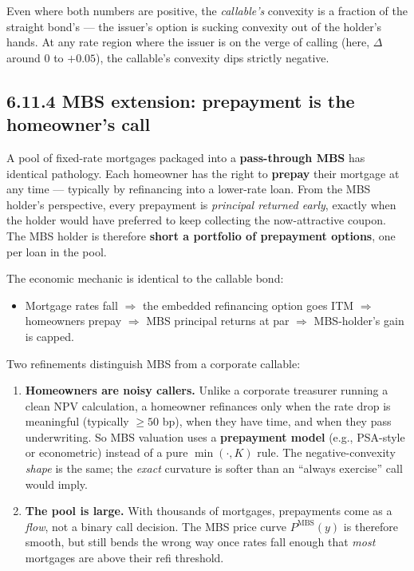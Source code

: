 \documentclass[
  10pt,
  twoside]{book}
\providecommand{\tightlist}{%
  \setlength{\itemsep}{0pt}\setlength{\parskip}{0pt}}
\begin{document}
Even where both numbers are positive, the \emph{callable's} convexity is
a fraction of the straight bond's --- the issuer's option is sucking
convexity out of the holder's hands. At any rate region where the issuer
is on the verge of calling (here, \(\Delta\) around \(0\) to \(+0.05\)),
the callable's convexity dips strictly negative.

\subsection{6.11.4 MBS extension: prepayment is the homeowner's
call}\label{mbs-extension-prepayment-is-the-homeowners-call}

A pool of fixed-rate mortgages packaged into a \textbf{pass-through MBS}
has identical pathology. Each homeowner has the right to \textbf{prepay}
their mortgage at any time --- typically by refinancing into a
lower-rate loan. From the MBS holder's perspective, every prepayment is
\emph{principal returned early}, exactly when the holder would have
preferred to keep collecting the now-attractive coupon. The MBS holder
is therefore \textbf{short a portfolio of prepayment options}, one per
loan in the pool.

The economic mechanic is identical to the callable bond:

\begin{itemize}
\tightlist
\item
  Mortgage rates fall \(\Rightarrow\) the embedded refinancing option
  goes ITM \(\Rightarrow\) homeowners prepay \(\Rightarrow\) MBS
  principal returns at par \(\Rightarrow\) MBS-holder's gain is capped.
\end{itemize}

Two refinements distinguish MBS from a corporate callable:

\begin{enumerate}
\def\labelenumi{\arabic{enumi}.}
\tightlist
\item
  \textbf{Homeowners are noisy callers.} Unlike a corporate treasurer
  running a clean NPV calculation, a homeowner refinances only when the
  rate drop is meaningful (typically \(\geq 50\) bp), when they have
  time, and when they pass underwriting. So MBS valuation uses a
  \textbf{prepayment model} (e.g., PSA-style or econometric) instead of
  a pure \(\min(\cdot, K)\) rule. The negative-convexity \emph{shape} is
  the same; the \emph{exact} curvature is softer than an ``always
  exercise'' call would imply.
\item
  \textbf{The pool is large.} With thousands of mortgages, prepayments
  come as a \emph{flow}, not a binary call decision. The MBS price curve
  \(P^{\text{MBS}}(y)\) is therefore smooth, but still bends the wrong
  way once rates fall enough that \emph{most} mortgages are above their
  refi threshold.
\end{enumerate}
\end{document}
